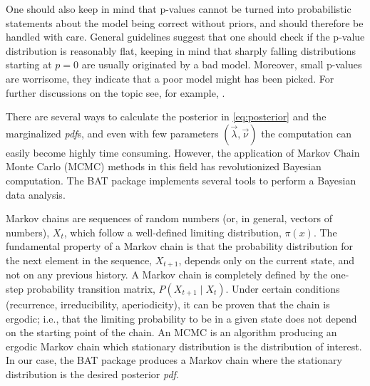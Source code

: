One should also keep in mind that p-values cannot be turned into probabilistic statements about the model being correct without priors, and should therefore be handled with care. General guidelines suggest that one should check if the p-value distribution is reasonably flat, keeping in mind that sharply falling distributions starting at $p=0$ are usually originated by a bad model. Moreover, small p-values are worrisome, they indicate that a poor model might has been picked. For further discussions on the topic see, for example, \cite{p-value}.

\newpage%
 There are several ways to calculate the posterior in \ref{eq:posterior} and the marginalized \emph{pdf}s, and even with few parameters $(\vec{\lambda},\vec{\nu})$ the computation can easily become highly time consuming. However, the application of Markov Chain Monte Carlo (MCMC) methods in this field has revolutionized Bayesian computation. The BAT package \cite{BAT} implements several tools to perform a Bayesian data analysis.

Markov chains are sequences of random numbers (or, in general, vectors of numbers), $X_t$, which follow a well-defined limiting distribution, $\pi(x)$. The fundamental property of a Markov chain is that the probability distribution for the next element in the sequence, $X_{t+1}$, depends only on the current state, and not on any previous history. A Markov chain is completely defined by the one-step probability transition matrix, $P(X_{t+1}\mid X_t)$. Under certain conditions (recurrence, irreducibility, aperiodicity), it can be proven that the chain is ergodic; i.e., that the limiting probability to be in a given state does not depend on the starting point of the chain. An MCMC is an algorithm producing an ergodic Markov chain which stationary distribution is the distribution of interest. In our case, the BAT package produces a Markov chain where the stationary distribution is the desired posterior \emph{pdf}.

